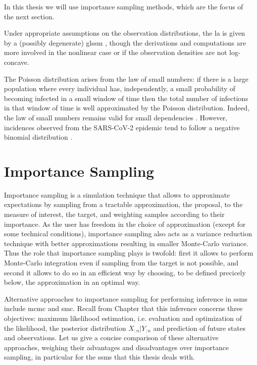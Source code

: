 In this thesis we will use importance sampling methods, which are the focus of the next section. 

Under appropriate assumptions on the observation distributions, the \gls{la} is given by a (possibly degenerate) \gls{glssm} \cite{Durbin1997Monte, Shephard1997Likelihood}, though the derivations and computations are more involved in the nonlinear case or if the observation densities are not log-concave.

\begin{theorem}
    
\end{theorem}

The Poisson distribution arises from the law of small numbers: if there is a large population where every individual has, independently, a small probability of becoming infected in a small window of time then the total number of infections in that window of time is well approximated by the Poisson distribution.
Indeed, the law of small numbers remains valid for small dependencies \cite{Ross2011Fundamentalsa,Arratia1990Poisson}.
However, incidences observed from the SARS-CoV-2 epidemic tend to follow a negative binomial distribution \cite{Chan2021Count}. 



\section{Importance Sampling}
\label{sec:importance_sampling}
Importance sampling is a simulation technique that allows to approximate expectations by sampling from a tractable approximation, the proposal, to the measure of interest, the target, and weighting samples according to their importance. As the user has freedom in the choice of approximation (except for some technical conditions), importance sampling also acts as a variance reduction technique with better approximations resulting in smaller Monte-Carlo variance. Thus the role that importance sampling plays is twofold: first it allows to perform Monte-Carlo integration even if sampling from the target is not possible, and second it allows to do so in an efficient way by choosing, to be defined precicely below, the approximation in an optimal way.

Alternative approaches to importance sampling for performing inference in \glspl{ssm} include \gls{mcmc} and \gls{smc}. 
Recall from Chapter  that this inference concerns three objectives: maximum likelihood estimation, i.e. evaluation and optimization of the likelihood, the posterior distribution $X_{:n} | Y_{:n}$ and prediction of future states and observations. Let us give a concise comparison of these alternative approaches, weighing their advantages and disadvantages over importance sampling, in particular for the \glspl{ssm} that this thesis deals with. 

